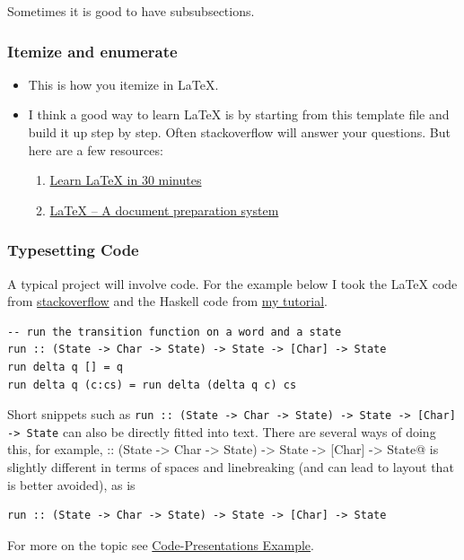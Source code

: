 \documentclass{article}
\theoremstyle{theorem}
\theoremstyle{definition}
\theoremstyle{remark}
\begin{document}
Sometimes it is good to have subsubsections.

\subsubsection{Itemize and enumerate}

\begin{itemize}
\item This is how you itemize in LaTeX.
\item I think a good way to learn LaTeX is by starting from this template file and build it up step by step. Often stackoverflow will answer your questions. But here are a few resources:
  \begin{enumerate}
  \item \href{https://www.overleaf.com/learn/latex/Learn_LaTeX_in_30_minutes}{Learn LaTeX in 30 minutes}
  \item \href{https://www.latex-project.org/}{LaTeX – A document preparation system}\end{enumerate}
\end{itemize}

\subsubsection{Typesetting Code}

A typical project will involve code. For the example below I took the LaTeX code from \href{https://stackoverflow.com/a/3175141/4600290}{stackoverflow} and the Haskell code from \href{https://hackmd.io/@alexhkurz/HylLKujCP}{my tutorial}.

\begin{lstlisting}
-- run the transition function on a word and a state
run :: (State -> Char -> State) -> State -> [Char] -> State
run delta q [] = q
run delta q (c:cs) = run delta (delta q c) cs 
\end{lstlisting}
%
Short snippets such as \texttt{run :: (State -> Char -> State) -> State -> [Char] -> State} can also be directly fitted into text. There are several ways of doing this, for example, \verb@run :: (State -> Char -> State) -> State -> [Char] -> State@ is slightly different in terms of spaces and linebreaking (and can lead to layout that is better avoided), as is
\begin{verbatim}run :: (State -> Char -> State) -> State -> [Char] -> State\end{verbatim}

\noindent
For more on the topic see \href{https://www.overleaf.com/latex/examples/code-presentations-example-different-ways-shown-in-beamer-metropolis/tsxpnyjbhbds}{Code-Presentations Example}.
\end{document}
